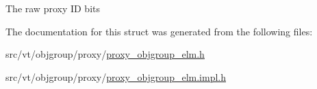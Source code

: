 The raw proxy ID bits 

The documentation for this struct was generated from the following files\+:\begin{DoxyCompactItemize}
\item 
src/vt/objgroup/proxy/\hyperlink{proxy__objgroup__elm_8h}{proxy\+\_\+objgroup\+\_\+elm.\+h}\item 
src/vt/objgroup/proxy/\hyperlink{proxy__objgroup__elm_8impl_8h}{proxy\+\_\+objgroup\+\_\+elm.\+impl.\+h}\end{DoxyCompactItemize}
